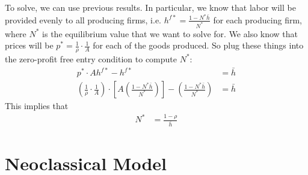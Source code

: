 \documentclass[12pt]{article}
\theoremstyle{plain}
\theoremstyle{definition}
\theoremstyle{remark}
\begin{document}
To solve, we can use previous results. In particular, we know that labor
will be provided evenly to all producing firms, i.e.
$h^{f*}=\frac{1-N^*\bar{h}}{N^*}$ for each producing firm, where $N^*$
is the equilibrium value that we want to solve for. We also know that
prices will be $p^*=\frac{1}{\rho}\cdot\frac{1}{A}$ for each of the
goods produced. So plug these things into the zero-profit free entry
condition to compute $N^*$:
\begin{align*}
  p^*\cdot Ah^{f*} - h^{f*} &= \bar{h} \\
  \left(\frac{1}{\rho}\cdot\frac{1}{A}\right)\cdot
  \left[A \left(\frac{1-N^*\bar{h}}{N^*}\right)\right]
  - \left(\frac{1-N^*\bar{h}}{N^*}\right)
  &= \bar{h}
\end{align*}
This implies that
\begin{align*}
  N^* &= \frac{1-\rho}{\bar{h}}
\end{align*}

\clearpage
\section{Neoclassical Model}
\end{document}
